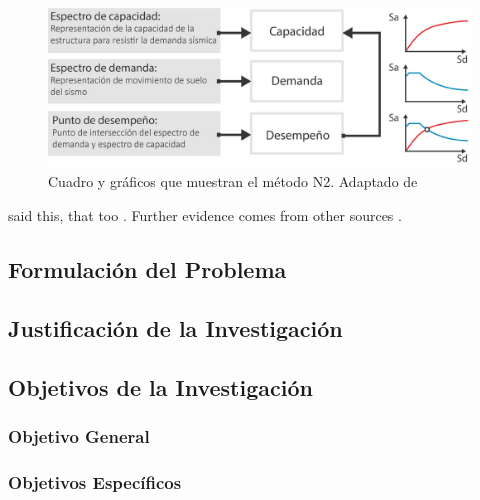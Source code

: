 \documentclass[doc, 12pt, a4paper, draftall]{apa7} %
\begin{document}
\begin{figure}[!ht]
	\centering
  \includegraphics[scale=0.36]{E_IMAGENES/3_Capitulo3/Cap3_Imagen70.png}
	\caption{\centering\footnotesize Cuadro y gráficos que muestran el método N2. Adaptado de \cite{deWaal2009}}
	\label{Cap3_Figura8}
\end{figure}

\Textcite{vonDavier2011} said this, that
too \parencite{vonDavier2011,Lassen2006}.  Further evidence comes from
other sources \parencite{Shotton1989,Lassen2006}.  

\lipsum[3]

\lipsum[4]

\subsection{Formulación del Problema}

\lipsum[5]

\subsection{Justificación de la Investigación}

\lipsum[6]

\subsection{Objetivos de la Investigación}

\lipsum[7]

\subsubsection{Objetivo General}

\lipsum[8]

\subsubsection{Objetivos Específicos}
\end{document}
